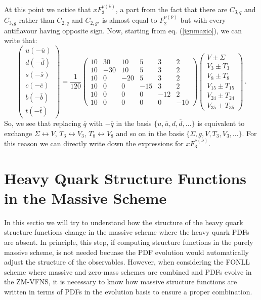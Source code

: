 \documentclass[10pt,a4paper]{article}
\begin{document}
At this point we notice that $xF_3^{\nu(\overline\nu)}$, a part from
the fact that there are $C_{3,q}$ and $C_{3,g}$ rather than $C_{2,q}$
and $C_{2,g}$, is almost equal to $F_2^{\nu(\overline\nu)}$ but with
every antiflavour having opposite sign. Now, starting from
eq. (\ref{ignmazio}), we can write that:
\begin{equation}\label{ignmazio1}
\begin{pmatrix}
u(-\overline u)\\
d(-\overline d)\\
s(-\overline s)\\
c(-\overline c)\\
b(-\overline b)\\
t(-\overline t)
\end{pmatrix}=
\frac{1}{120}
\begin{pmatrix}
 10 &  30 &  10 &   5 &   3 &   2 \\
 10 & -30 &  10 &   5 &   3 &   2 \\
 10 &   0 & -20 &   5 &   3 &   2 \\
 10 &   0 &   0 & -15 &   3 &   2 \\
 10 &   0 &   0 &   0 & -12 &   2 \\
 10 &   0 &   0 &   0 &   0 & -10
\end{pmatrix}
\begin{pmatrix}
V\pm \Sigma \\ V_3\pm T_3 \\ V_8\pm T_8 \\ V_{15}\pm T_{15} \\ V_{24}\pm T_{24} \\ V_{35}\pm T_{35}
\end{pmatrix}\,.
\end{equation}
So, we see that replacing $\overline{q}$ with $-\overline{q}$ in the
basis $\{u,\overline{u},d,\overline{d},\dots\}$ is equivalent to
exchange $\Sigma\leftrightarrow V$, $T_3\leftrightarrow V_3$,
$T_8\leftrightarrow V_8$ and so on in the basis
$\{\Sigma,g,V,T_3,V_3,\dots\}$. For this reason we can directly write
down the expressions for $xF_3^{\nu(\overline{\nu})}$.

\section{Heavy Quark Structure Functions in the Massive Scheme}

In this sectio we will try to understand how the structure of the
heavy quark structure functions change in the massive scheme where the
heavy quark PDFs are absent. In principle, this step, if computing
structure functions in the purely massive scheme, is not needed
becuase the PDF evolution would automatically adjust the structure of
the observables. However, when considering the FONLL scheme where
massive and zero-mass schemes are combined and PDFs evolve in the
ZM-VFNS, it is necessary to know how massive structure functions are
written in terms of PDFs in the evolution basis to ensure a proper
combination.
\end{document}
